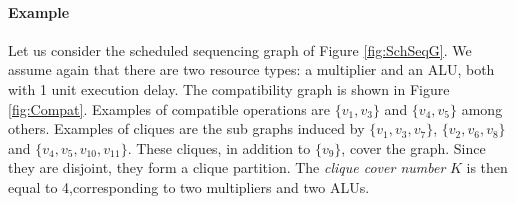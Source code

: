 \paragraph{Example}
Let us consider the scheduled sequencing graph of Figure \ref{fig:SchSeqG}. We  assume again that there are two resource types:  a  multiplier and  an  ALU,  both  with  1  unit execution delay. The compatibility graph is shown in Figure \ref{fig:Compat}. Examples of compatible operations are $ \lbrace v_1,v_3 \rbrace $ and $ \lbrace v_4,v_5 \rbrace $ among others. Examples of cliques are the sub graphs induced by $ \lbrace v_1,v_3,v_7 \rbrace $, $ \lbrace v_2,v_6,v_8 \rbrace $ and $ \lbrace v_4,v_5,v_{10},v_{11} \rbrace $.   These cliques, in addition to $ \lbrace v_9 \rbrace $,  cover the graph. Since they  are disjoint, they form a clique partition. The \textit{clique cover number} $ K $  is then equal to  4,corresponding to two multipliers and two ALUs.
